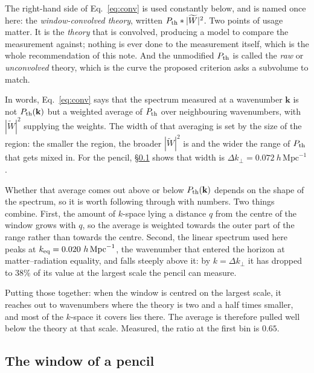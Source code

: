 \documentclass[12pt]{article}
\newcommand{\bk}{\mathbf{k}}
\begin{document}
The right-hand side of Eq.~\eqref{eq:conv} is used constantly below, and is
named once here: the \emph{window-convolved theory}, written
$P_{\rm th} \ast |\widetilde W|^2$. Two points of usage matter. It is the
\emph{theory} that is convolved, producing a model to compare the measurement
against; nothing is ever done to the measurement itself, which is the whole
recommendation of this note. And the unmodified $P_{\rm th}$ is called the
\emph{raw} or \emph{unconvolved} theory, which is the curve the proposed
criterion asks a subvolume to match.

In words, Eq.~\eqref{eq:conv} says that the spectrum measured at a wavenumber
$\bk$ is not $P_{\rm th}(\bk)$ but a weighted average of $P_{\rm th}$ over
neighbouring wavenumbers, with $|\widetilde W|^2$ supplying the weights. The
width of that averaging is set by the size of the region: the smaller the
region, the broader $|\widetilde W|^2$ is and the wider the range of $P_{\rm th}$
that gets mixed in. For the pencil, \S\ref{sec:winform} shows that width is
$\Delta k_\perp = 0.072\ h\,\mathrm{Mpc}^{-1}$.

Whether that average comes out above or below $P_{\rm th}(\bk)$ depends on the
shape of the spectrum, so it is worth following through with numbers. Two
things combine. First, the amount of $k$-space lying a distance $q$ from the
centre of the window grows with $q$, so the average is weighted towards the
outer part of the range rather than towards the centre. Second, the linear
spectrum used here peaks at $k_{\rm eq} = 0.020\ h\,\mathrm{Mpc}^{-1}$, the
wavenumber that entered the horizon at matter--radiation equality, and falls
steeply above it: by $k = \Delta k_\perp$ it has dropped to $38\%$ of its value
at the largest scale the pencil can measure.

Putting those together: when the window is centred on the largest scale, it
reaches out to wavenumbers where the theory is two and a half times smaller, and
most of the $k$-space it covers lies there. The average is therefore pulled well
below the theory at that scale. Measured, the ratio at the first bin is $0.65$.

\subsection{The window of a pencil}
\label{sec:winform}
\end{document}
